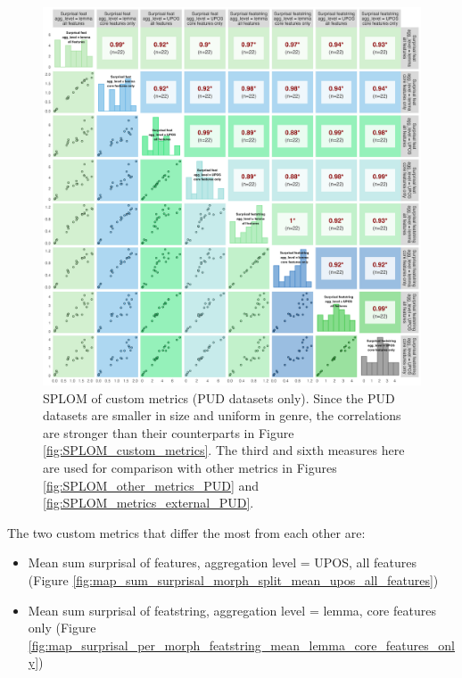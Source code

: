 \documentclass[USenglish]{article}
\begin{document}
\begin{figure}
    \centering
    \includegraphics[width=1\linewidth]{latex/graphics/SPLOM_custom_metrics_PUD.png}
    \caption{SPLOM of custom metrics (PUD datasets only). Since the PUD datasets are smaller in size and uniform in genre, the correlations are stronger than their counterparts in Figure \ref{fig:SPLOM_custom_metrics}. The third and sixth measures here are used for comparison with other metrics in Figures \ref{fig:SPLOM_other_metrics_PUD} and \ref{fig:SPLOM_metrics_external_PUD}.}
    \label{fig:SPLOM_custom_metrics_PUD}
\end{figure}

\FloatBarrier
\noindent The two custom metrics that differ the most from each other are:
\begin{itemize}
    \item Mean sum surprisal of features, aggregation level = UPOS, all features (Figure \ref{fig:map_sum_surprisal_morph_split_mean_upos_all_features})
    \item Mean sum surprisal of featstring, aggregation level = lemma, core features only (Figure \ref{fig:map_surprisal_per_morph_featstring_mean_lemma_core_features_only})
\end{itemize}
\end{document}
